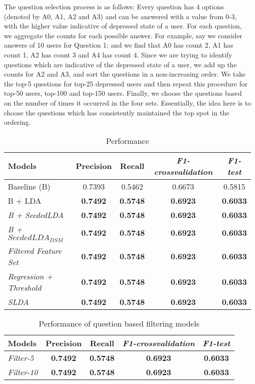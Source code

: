The question selection process is as follows: Every question has 4 options (denoted by A0, A1, A2 and A3) and can be answered with a value from 0-3, with the higher value indicative of depressed state of a user. For each question, we aggregate the counts for each possible answer. For example, say we consider answers of 10 users for Question 1; and we find that A0 has count 2, A1 has count 1, A2 has count 3 and A4 has count 4. Since we are trying to identify questions which are indicative of the depressed state of a user, we add up the counts for A2 and A3, and sort the questions in a non-increasing order. We take the top-5 questions for top-25 depressed users and then repeat this procedure for top-50 users, top-100 and top-150 users. Finally, we choose the questions based on the number of times it occurred in the four sets. Essentially, the idea here is to choose the questions which has consistently maintained the top spot in the ordering.




\begin{table} [ht]
\begin{tabular}{lcccc}
\toprule
Models & Precision & Recall & \textit{F1-crossvalidation} & \textit{F1-test}  \\
\midrule
Baseline (B) & 0.7393 & 0.5462 & 0.6673 & 0.5815 \\
B + LDA & \textbf{0.7492} & \textbf{0.5748} & \textbf{0.6923} & \textbf{0.6033} \\
\textit{B + SeededLDA} & \textbf{0.7492} & \textbf{0.5748} & \textbf{0.6923} & \textbf{0.6033} \\
\textit{B + $SeededLDA_{DSM}$} & \textbf{0.7492} & \textbf{0.5748} & \textbf{0.6923} & \textbf{0.6033} \\
\textit{Filtered Feature Set} & \textbf{0.7492} & \textbf{0.5748} & \textbf{0.6923} & \textbf{0.6033} \\
\textit{Regression + Threshold} & \textbf{0.7492} & \textbf{0.5748} & \textbf{0.6923} & \textbf{0.6033} \\
\textit{SLDA } & \textbf{0.7492} & \textbf{0.5748} & \textbf{0.6923} & \textbf{0.6033} \\
\bottomrule
\end{tabular}
\caption{Performance}
\label{table:results_1}
\end{table}


\begin{table} [ht]
\begin{tabular}{lcccc}
\toprule
Models & Precision & Recall & \textit{F1-crossvalidation} & \textit{F1-test}  \\
\midrule
\textit{Filter-5} & \textbf{0.7492} & \textbf{0.5748} & \textbf{0.6923} & \textbf{0.6033} \\
\textit{Filter-10} & \textbf{0.7492} & \textbf{0.5748} & \textbf{0.6923} & \textbf{0.6033} \\
\bottomrule
\end{tabular}
\caption{Performance of question based filtering models}
\label{table:results_2}
\end{table}

